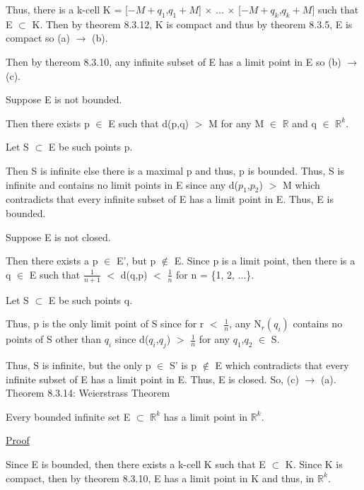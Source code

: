 	Thus, there is a k-cell
	K = [$-M+q_1$,$q_1+M$] $\times$ ... $\times$ [$-M+q_k$,$q_k+M$]
	such that E $\subset$ K.
	Then by {\color{red} theorem 8.3.12}, K is compact
	and thus by {\color{red} theorem 8.3.5}, E is compact
	so (a) $\rightarrow$ (b).

	Then by {\color{red} thereom 8.3.10}, any infinite subset
	of E has a limit point in E so (b) $\rightarrow$ (c).

	Suppose E is not bounded.

	Then there exists p $\in$ E such that d(p,q) $>$ M for
	any M $\in$ $\mathbb{R}$ and q $\in$ $\mathbb{R}^k$.

	Let S $\subset$ E be such points p.
	
	Then S is infinite else there is a maximal p and thus,
	p is bounded.
	Thus, S is infinite and contains no limit points in E
	since any d($p_1$,$p_2$) $>$ M which contradicts that
	every infinite subset of E has a limit point in E.
	Thus, E is bounded.

	Suppose E is not closed.

	Then there exists a p $\in$ E', but p $\not \in$ E.
	Since p is a limit point, then there is a
	q $\in$ E such that $\frac{1}{n+1}$ $<$ d(q,p) $<$ $\frac{1}{n}$
	for n = \{1, 2, ...\}.

	Let S $\subset$ E be such points q.

	Thus, p is the only limit point of S since for r $<$ $\frac{1}{n}$,
	any N$_r(q_i)$ contains no points of S other than $q_i$ since
	d($q_i$,$q_j$) $>$ $\frac{1}{n}$ for any $q_1$,$q_2$ $\in$ S.
	
	Thus, S is infinite, but the only p $\in$ S' is p $\not \in$ E
	which contradicts that every infinite subset of E has a
	limit point in E. Thus, E is closed. So, (c) $\rightarrow$ (a). \\

{ \color{red} Theorem 8.3.14: Weierstrass Theorem } 

	\begin{adjustbox}{minipage=14cm, right, vspace=0.1cm 0cm}
		Every bounded infinite set E $\subset$ $\mathbb{R}^k$ has
		a limit point in $\mathbb{R}^k$.
	\end{adjustbox}

{ \color{magenta} \underline{Proof} } 

	Since E is bounded, then there exists a k-cell K such that
	E $\subset$ K.
	Since K is compact, then by {\color{red} theorem 8.3.10},
	E has a limit point in K and thus, in $\mathbb{R}^k$.





